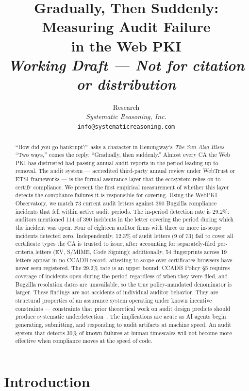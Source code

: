 \documentclass[10pt,twocolumn,letterpaper]{article}
\title{\Large\textbf{Gradually, Then Suddenly: Measuring Audit Failure\\in the Web PKI}\\[0.5em]
\normalsize\textit{Working Draft --- Not for citation or distribution}}
\author{
Research\\
\textit{Systematic Reasoning, Inc.}\\
\texttt{info@systematicreasoning.com}
}
\date{}
\begin{document}
\maketitle

\begin{abstract}
``How did you go bankrupt?'' asks a character in Hemingway's
\textit{The Sun Also Rises}. ``Two ways,'' comes the reply. ``Gradually,
then suddenly.'' Almost every CA the Web PKI has distrusted had passing annual
audit reports in the period leading up to removal. The audit system --- accredited third-party annual review
under WebTrust or ETSI frameworks --- is the formal assurance layer that
the ecosystem relies on to certify compliance. We present the first
empirical measurement of whether this layer detects the compliance
failures it is responsible for covering. Using the WebPKI Observatory,
we match 73 current audit letters against 390 Bugzilla compliance
incidents that fell within active audit periods. The in-period detection
rate is 29.2\%: auditors mentioned 114 of 390 incidents in the letter
covering the period during which the incident was open. Four of
eighteen auditor firms with three or more in-scope incidents detected
zero. Independently, 12.3\% of audit letters (9 of 73) fail to cover all certificate types the CA is
trusted to issue, after accounting for separately-filed per-criteria
letters (EV, S/MIME, Code Signing);
additionally, 54 fingerprints across 19 letters appear in no CCADB record,
attesting to scope over certificates browsers have never seen registered. The 29.2\% rate is an
upper bound: CCADB Policy \S5 requires coverage of incidents open
during the period regardless of when they were filed, and Bugzilla
resolution dates are unavailable, so the true policy-mandated denominator
is larger. These findings are not accidents of individual auditor behavior.
They are structural properties of an assurance system operating under
known incentive constraints --- constraints that prior theoretical
work on audit design predicts should produce systematic underdetection~\cite{hurst2023, hurst2025}.
The implications are acute as AI agents begin generating, submitting,
and responding to audit artifacts at machine speed. An audit system that
detects 30\% of known failures at human timescales will not become more
effective when compliance moves at the speed of code.
\end{abstract}

\section{Introduction}
\label{sec:intro}
\end{document}
